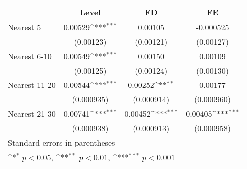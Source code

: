 {
\def\sym#1{\ifmmode^{#1}\else\(^{#1}\)\fi}
\begin{tabular}{l*{3}{c}}
\hline\hline
            &\multicolumn{1}{c}{Level}&\multicolumn{1}{c}{FD}&\multicolumn{1}{c}{FE}\\
\hline
Nearest 5   &     0.00529\sym{***}&     0.00105         &   -0.000525         \\
            &   (0.00123)         &   (0.00121)         &   (0.00127)         \\
[1em]
Nearest 6-10&     0.00549\sym{***}&     0.00150         &     0.00109         \\
            &   (0.00125)         &   (0.00124)         &   (0.00130)         \\
[1em]
Nearest 11-20&     0.00544\sym{***}&     0.00252\sym{**} &     0.00177         \\
            &  (0.000935)         &  (0.000914)         &  (0.000960)         \\
[1em]
Nearest 21-30&     0.00741\sym{***}&     0.00452\sym{***}&     0.00405\sym{***}\\
            &  (0.000938)         &  (0.000913)         &  (0.000958)         \\
\hline\hline
\multicolumn{4}{l}{\footnotesize Standard errors in parentheses}\\
\multicolumn{4}{l}{\footnotesize \sym{*} \(p<0.05\), \sym{**} \(p<0.01\), \sym{***} \(p<0.001\)}\\
\end{tabular}
}
